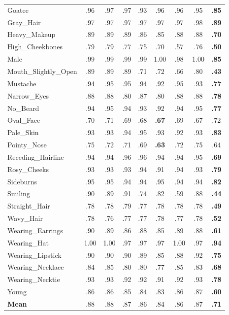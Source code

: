 \begin{table}[p]
\begin{tabular}{l|cccccccc}
Goatee & .96 & .97 & .97 & .93 & .96 & .96 & .95 & \textbf{.85} \\
Gray\_Hair & .97 & .97 & .97 & .97 & .97 & .97 & .98 & \textbf{.89} \\
Heavy\_Makeup & .89 & .89 & .89 & .86 & .85 & .88 & .88 & \textbf{.70} \\
High\_Cheekbones & .79 & .79 & .77 & .75 & .70 & .57 & .76 & \textbf{.50} \\
Male & .99 & .99 & .99 & .99 & 1.00 & .98 & 1.00 & \textbf{.85} \\
Mouth\_Slightly\_Open & .89 & .89 & .89 & .71 & .72 & .66 & .80 & \textbf{.43} \\
Mustache & .94 & .95 & .95 & .94 & .92 & .95 & .93 & \textbf{.77} \\
Narrow\_Eyes & .88 & .88 & .80 & .87 & .80 & .88 & .88 & \textbf{.78} \\
No\_Beard & .94 & .95 & .94 & .93 & .92 & .94 & .95 & \textbf{.77} \\
Oval\_Face & .70 & .71 & .69 & .68 & \textbf{.67} & .69 & .67 & .72 \\
Pale\_Skin & .93 & .93 & .94 & .95 & .93 & .92 & .93 & \textbf{.83} \\
Pointy\_Nose & .75 & .72 & .71 & .69 & \textbf{.63} & .72 & .75 & .64 \\
Receding\_Hairline & .94 & .94 & .96 & .96 & .94 & .94 & .95 & \textbf{.69} \\
Rosy\_Cheeks & .93 & .93 & .93 & .94 & .91 & .94 & .93 & \textbf{.79} \\
Sideburns & .95 & .95 & .94 & .94 & .95 & .94 & .94 & \textbf{.82} \\
Smiling & .90 & .89 & .91 & .74 & .82 & .59 & .88 & \textbf{.44} \\
Straight\_Hair & .78 & .78 & .79 & .77 & .78 & .78 & .78 & \textbf{.49} \\
Wavy\_Hair & .78 & .76 & .77 & .77 & .78 & .77 & .78 & \textbf{.52} \\
Wearing\_Earrings & .90 & .89 & .86 & .88 & .85 & .89 & .88 & \textbf{.61} \\
Wearing\_Hat & 1.00 & 1.00 & .97 & .97 & .97 & 1.00 & .97 & \textbf{.94} \\
Wearing\_Lipstick & .90 & .90 & .90 & .89 & .85 & .88 & .92 & \textbf{.75} \\
Wearing\_Necklace & .84 & .85 & .80 & .80 & .77 & .85 & .83 & \textbf{.68} \\
Wearing\_Necktie & .93 & .93 & .92 & .92 & .91 & .92 & .93 & \textbf{.78} \\
Young & .86 & .86 & .85 & .84 & .83 & .86 & .87 & \textbf{.60} \\
\midrule
\textbf{Mean} & .88 & .88 & .87 & .86 & .84 & .86 & .87 & \textbf{.71} \\
\bottomrule
\end{tabular}
\end{table}

